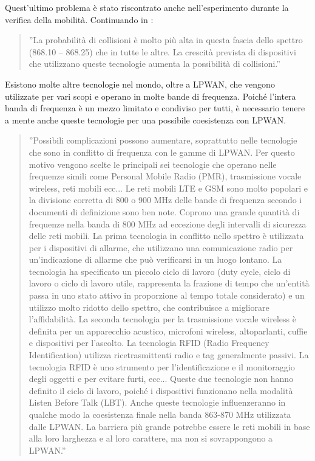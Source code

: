 \documentclass[a4paper]{report} %
\begin{document}
Quest'ultimo problema è stato riscontrato anche nell'esperimento \cite{art:rif.47} durante la verifica della mobilità. Continuando in \cite{art:rif.46}:
\begin{quote}
	''La probabilità di collisioni è molto più alta in questa fascia dello spettro (868.10 – 868.25) che in tutte le altre. La crescità prevista di dispositivi che utilizzano queste tecnologie aumenta la possibilità di collisioni.''
\end{quote}
Esistono molte altre tecnologie nel mondo, oltre a LPWAN, che vengono utilizzate per vari scopi e operano in molte bande di frequenza. Poiché l'intera banda di frequenza è un mezzo limitato e condiviso per tutti, è necessario tenere a mente anche queste tecnologie per una possibile coesistenza con LPWAN. 
\begin{quote}
	''Possibili complicazioni possono aumentare, soprattutto nelle tecnologie che sono in conflitto di frequenza con le gamme di LPWAN. Per questo motivo vengono scelte le principali sei tecnologie che operano nelle frequenze simili come Personal Mobile Radio (PMR), trasmissione vocale wireless, reti mobili ecc... Le reti mobili LTE e GSM sono molto popolari e la divisione corretta di 800 o 900 MHz delle bande di frequenza secondo i documenti di definizione sono ben note. Coprono una grande quantità di frequenze nella banda di 800 MHz ad eccezione degli intervalli di sicurezza delle reti mobili.
	La prima tecnologia in conflitto nello spettro è utilizzata per i dispositivi di allarme, che utilizzano una comunicazione radio per un'indicazione di allarme che può verificarsi in un luogo lontano. La tecnologia ha specificato un piccolo ciclo di lavoro (duty cycle, ciclo di lavoro o ciclo di lavoro utile, rappresenta la frazione di tempo che un'entità passa in uno stato attivo in proporzione al tempo totale considerato) e un utilizzo molto ridotto dello spettro, che contribuisce a migliorare l'affidabilità. La seconda tecnologia per la trasmissione vocale wireless è definita per un apparecchio acustico, microfoni wireless, altoparlanti, cuffie e dispositivi per l'ascolto. La tecnologia RFID (Radio Frequency Identification) utilizza ricetrasmittenti radio e tag generalmente passivi. La tecnologia RFID è uno strumento per l'identificazione e il monitoraggio degli oggetti e per evitare furti, ecc... Queste due tecnologie non hanno definito il ciclo di lavoro, poiché i dispositivi funzionano nella modalità Listen Before Talk (LBT). Anche queste tecnologie influenzeranno in qualche modo la coesistenza finale nella banda 863-870 MHz utilizzata dalle LPWAN. La barriera più grande potrebbe essere le reti mobili in base alla loro larghezza e al loro carattere, ma non si sovrappongono a LPWAN.''
\end{quote}
\end{document}

